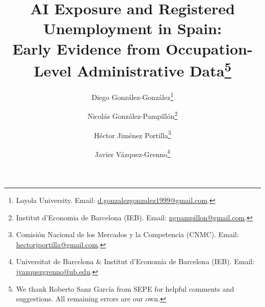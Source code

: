 
\usepackage[utf8]{inputenc}
\usepackage{geometry}
\usepackage{setspace}
\usepackage{booktabs}
\usepackage{threeparttable}
\usepackage{graphicx}
\usepackage{pgfplots}
\pgfplotsset{compat=1.18}
\usepackage{fvextra}
\usepackage{caption}
\usepackage{subcaption}
\usepackage{float}
\usepackage{adjustbox}
\usepackage{amsmath,amssymb}
\usepackage{natbib}
\usepackage{url}
\usepackage{xcolor}
\usepackage{pdflscape}   %
\usepackage{array}       %
\usepackage[colorlinks=true,linkcolor=blue,citecolor=blue,urlcolor=blue]{hyperref}
\usepackage{longtable}
\usepackage{placeins}

\makeatletter
\patchcmd{\LT@output}{\copy\LT@foot\vss}{\copy\LT@foot\vfil}{}{}
\patchcmd{\LT@output}{\copy\LT@foot\vss}{\copy\LT@foot\vfil}{}{}
\makeatother

\captionsetup{font=small, labelfont=bf}
\setlength{\parskip}{0.45em}
\setlength{\parindent}{0pt}
\setlength{\emergencystretch}{2em}

\newcommand{\tabdir}{output/tables}
\newcommand{\panelwidth}{0.70\textwidth}
\newcommand{\descriptivepanelwidth}{0.66\textwidth}
\newcommand{\smallpanelwidth}{0.48\textwidth}
\newcommand{\figdir}{output/figures}

\geometry{margin=1in}
\onehalfspacing
\raggedbottom
\graphicspath{{output/figures/}}

\title{AI Exposure and Registered Unemployment in Spain:\\Early Evidence from Occupation-Level Administrative Data\thanks{We thank Roberto Sanz García from SEPE for helpful comments and suggestions. All remaining errors are our own.}
}


\author{
Diego Gonz\'alez-Gonz\'alez\thanks{Loyola University. Email: \href{mailto:d.gonzalezgonzalez1999@gmail.com}{d.gonzalezgonzalez1999@gmail.com}.%
}
\and
Nicol\'as Gonz\'alez-Pampill\'on\thanks{Institut d'Economia de Barcelona (IEB). Email: \href{mailto:ngpampillon@gmail.com}{ngpampillon@gmail.com}. %
}
\and
H\'ector Jim\'enez Portilla\thanks{Comisi\'on Nacional de los Mercados y la Competencia (CNMC). Email: \href{mailto:hectorjportilla@gmail.com}{hectorjportilla@gmail.com}.}
\and
Javier V\'azquez-Grenno\thanks{Universitat de Barcelona \& Institut d'Economia de Barcelona (IEB). Email: \href{mailto:jvazquezgrenno@ub.edu}{jvazquezgrenno@ub.edu}.%
}
}


